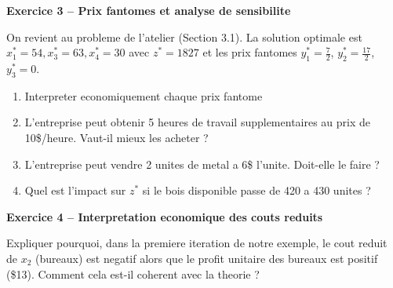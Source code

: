 \documentclass[12pt,a4paper]{article}
\begin{document}
\begin{exemple}
\textbf{Exercice 3 -- Prix fantomes et analyse de sensibilite}

On revient au probleme de l'atelier (Section 3.1). La solution optimale est $x_1^* = 54, x_3^* = 63, x_4^* = 30$ avec $z^* = 1827$ et les prix fantomes $y_1^* = \frac{7}{2}$, $y_2^* = \frac{17}{2}$, $y_3^* = 0$.

\begin{enumerate}
    \item Interpreter economiquement chaque prix fantome
    \item L'entreprise peut obtenir 5 heures de travail supplementaires au prix de 10\$/heure. Vaut-il mieux les acheter ?
    \item L'entreprise peut vendre 2 unites de metal a 6\$ l'unite. Doit-elle le faire ?
    \item Quel est l'impact sur $z^*$ si le bois disponible passe de 420 a 430 unites ?
\end{enumerate}
\end{exemple}

\begin{exemple}
\textbf{Exercice 4 -- Interpretation economique des couts reduits}

Expliquer pourquoi, dans la premiere iteration de notre exemple, le cout reduit de $x_2$ (bureaux) est negatif alors que le profit unitaire des bureaux est positif (\$13). Comment cela est-il coherent avec la theorie ?
\end{exemple}
\end{document}
